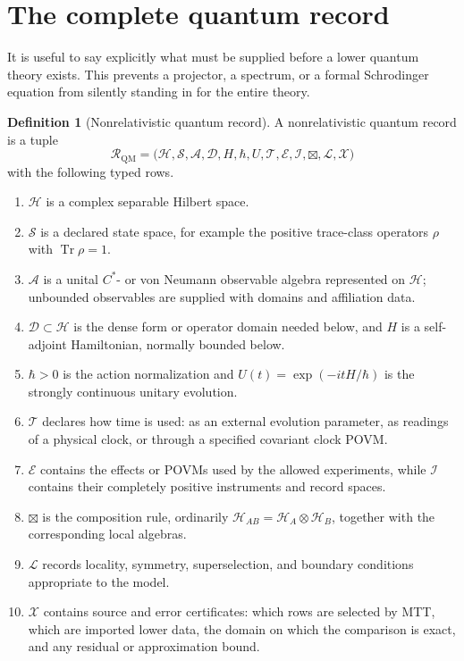 \documentclass[11pt]{article}
\theoremstyle{definition}
\newtheorem{definition}[theorem]{Definition}
\theoremstyle{remark}
\newcommand{\cA}{\mathcal A}
\newcommand{\cD}{\mathcal D}
\newcommand{\cE}{\mathcal E}
\newcommand{\cH}{\mathcal H}
\newcommand{\cI}{\mathcal I}
\newcommand{\cL}{\mathcal L}
\newcommand{\cR}{\mathcal R}
\newcommand{\cS}{\mathcal S}
\newcommand{\cT}{\mathcal T}
\newcommand{\cX}{\mathcal X}
\newcommand{\Tr}{\operatorname{Tr}}
\let\MTToriginalitem\item
\renewcommand{\item}{\par\MTToriginalitem}
\begin{document}
\section{The complete quantum record}
\label{sec:record}

It is useful to say explicitly what must be supplied before a lower quantum
theory exists.  This prevents a projector, a spectrum, or a formal
Schrodinger equation from silently standing in for the entire theory.

\begin{definition}[Nonrelativistic quantum record]
\label{def:record}
A nonrelativistic quantum record is a tuple
\[
\cR_{\mathrm{QM}}
=
\bigl(
\cH,\cS,\cA,\cD,H,\hbar,U,\cT,\cE,\cI,\boxtimes,\cL,\cX
\bigr)
\]
with the following typed rows.
\begin{enumerate}[leftmargin=2.2em]
\item \(\cH\) is a complex separable Hilbert space.
\item \(\cS\) is a declared state space, for example the positive
      trace-class operators \(\rho\) with \(\Tr\rho=1\).
\item \(\cA\) is a unital \(C^*\)- or von Neumann observable algebra
      represented on \(\cH\); unbounded observables are supplied with
      domains and affiliation data.
\item \(\cD\subset\cH\) is the dense form or operator domain needed below,
      and \(H\) is a self-adjoint Hamiltonian, normally bounded below.
\item \(\hbar>0\) is the action normalization and
      \(U(t)=\exp(-itH/\hbar)\) is the strongly continuous unitary evolution.
\item \(\cT\) declares how time is used: as an external evolution parameter,
      as readings of a physical clock, or through a specified covariant
      clock POVM.
\item \(\cE\) contains the effects or POVMs used by the allowed
      experiments, while \(\cI\) contains their completely positive
      instruments and record spaces.
\item \(\boxtimes\) is the composition rule, ordinarily
      \(\cH_{AB}=\cH_A\otimes\cH_B\), together with the corresponding local
      algebras.
\item \(\cL\) records locality, symmetry, superselection, and boundary
      conditions appropriate to the model.
\item \(\cX\) contains source and error certificates: which rows are
      selected by MTT, which are imported lower data, the domain on which
      the comparison is exact, and any residual or approximation bound.
\end{enumerate}
\end{definition}
\end{document}
